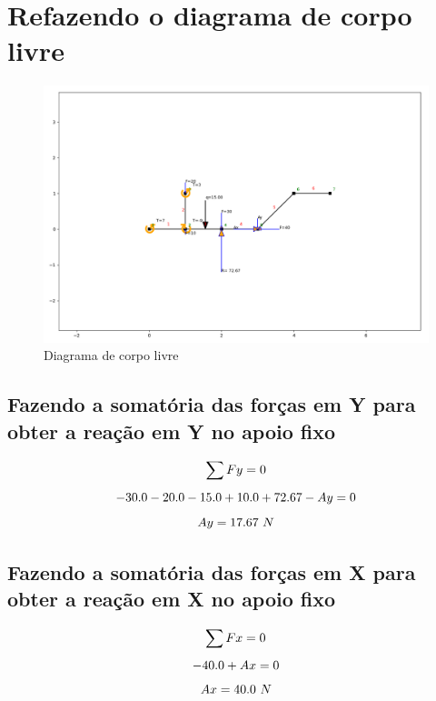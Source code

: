 \documentclass[a4paper,12pt]{article}%
\begin{document}
%
\section{Refazendo o diagrama de corpo livre}%
\label{sec:Refazendoodiagramadecorpolivre}%


\begin{figure}[H]%
\centering%
\includegraphics[width=500px]{figs/diagram2}%
\caption{\label{fig:corpolivre} Diagrama de corpo livre}%
\end{figure}

%
\subsection{Fazendo a somatória das forças em Y para obter a reação em Y no apoio fixo}%
\label{subsec:FazendoasomatriadasforasemYparaobterareaoemYnoapoiofixo}%
\begin{dmath*}%
\sum{Fy} = 0 \\%
\end{dmath*}%
\begin{dmath*}%
-30.0 - 20.0 - 15.0 + 10.0 + 72.67 - Ay = 0\\%
\end{dmath*}%
\begin{dmath*}%
Ay = 17.67$ $N%
\end{dmath*}

%
\subsection{Fazendo a somatória das forças em X para obter a reação em X no apoio fixo}%
\label{subsec:FazendoasomatriadasforasemXparaobterareaoemXnoapoiofixo}%
\begin{dmath*}%
\sum{Fx} = 0 \\%
\end{dmath*}%
\begin{dmath*}%
-40.0 + Ax = 0\\%
\end{dmath*}%
\begin{dmath*}%
Ax = 40.0$ $N%
\end{dmath*}
\end{document}
